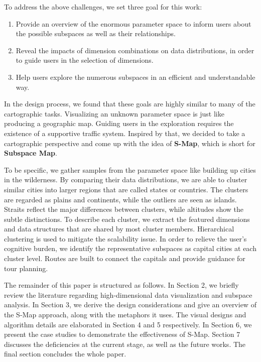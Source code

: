 To address the above challenges, we set three goal for this work:
\begin{enumerate} 
\item Provide an overview of the enormous parameter space to inform users about the possible subspaces as well as their relationships.
\item Reveal the impacts of dimension combinations on data distributions, in order to guide users in the selection of dimensions.
\item Help users explore the numerous subspaces in an efficient and understandable way.
\end{enumerate}
In the design process, we found that these goals are highly similar to many of the cartographic tasks. Visualizing an unknown parameter space is just like producing a geographic map. Guiding users in the exploration requires the existence of a supportive traffic system. Inspired by that, we decided to take a cartographic perspective and come up with the idea of \textbf{S-Map}, which is short for \textbf{Subspace Map}.

To be specific, we gather samples from the parameter space like building up cities in the wilderness. By comparing their data distributions, we are able to cluster similar cities into larger regions that are called states or countries. The clusters are regarded as plains and continents, while the outliers are seen as islands. Straits reflect the major differences between clusters, while altitudes show the subtle distinctions. To describe each cluster, we extract the featured dimensions and data structures that are shared by most cluster members. Hierarchical clustering is used to mitigate the scalability issue. In order to relieve the user's cognitive burden, we identify the representative subspaces as capital cities at each cluster level. Routes are built to connect the capitals and provide guidance for tour planning.

The remainder of this paper is structured as follows. In Section 2, we briefly review the literature regarding high-dimensional data visualization and subspace analysis. In Section 3, we derive the design considerations and give an overview of the S-Map approach, along with the metaphors it uses. The visual designs and algorithm details are elaborated in Section 4 and 5 respectively. In Section 6, we present the case studies to demonstrate the effectiveness of S-Map. Section 7 discusses the deficiencies at the current stage, as well as the future works. The final section concludes the whole paper.